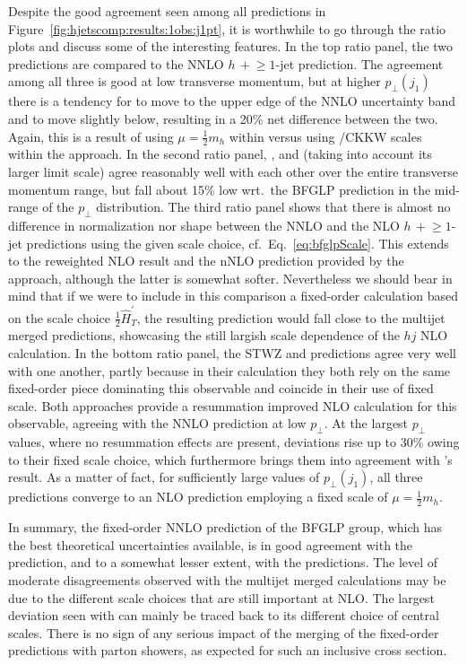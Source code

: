 Despite the good agreement seen among all predictions in
Figure~\ref{fig:hjetscomp:results:1obs:j1pt}, it is worthwhile to go
through the ratio plots and discuss some of the interesting features.
In the top ratio panel, the two \NNLOPS predictions are compared to the
NNLO $h\,+\!\ge\!1$-jet prediction. The agreement among all three is
good at low transverse momentum, but at higher $p_\perp(j_1)$ there is
a tendency for \Sherpa \NNLOPS to move to the upper edge of the NNLO 
uncertainty band and \Powheg \NNLOPS to move slightly below, resulting 
in a 20\% net difference between the two. Again, this is a result of using
$\mu=\tfrac{1}{2}m_h$ within \Sherpa versus using \Minlo/CKKW scales within the
\Powheg approach. In the second ratio panel, \Herwig, \Sherpa and \MGaMC
(taking into account its larger limit scale) agree reasonably well
with each other over the entire transverse momentum range, but fall
about 15\% low wrt.~the BFGLP prediction in the mid-range of the
$p_\perp$ distribution. The third ratio panel shows that there is almost no
difference in normalization nor shape between the NNLO and the NLO
$h\,+\!\ge\!1$-jet predictions using the given scale choice,
cf.~Eq.~\eqref{eq:bfglpScale}. This extends to the \Minlo reweighted
NLO result and the nNLO prediction provided by the \Loopsim approach,
although the latter is somewhat softer. Nevertheless we should bear in
mind that if we were to include in this comparison a fixed-order
calculation based on the scale choice $\tfrac{1}{2}\hat H_T^\prime$,
the resulting prediction would fall close to the multijet merged
predictions, showcasing the still largish scale dependence of the $hj$
NLO calculation. In the bottom ratio panel, the STWZ and \Resbos
predictions agree very well with one another, partly because in their
calculation they both rely on the same fixed-order piece dominating
this observable and coincide in their use of fixed scale. Both
approaches provide a resummation improved NLO calculation for this
observable, agreeing with the NNLO prediction at low $p_\perp$. At the
largest $p_\perp$ values, where no resummation effects are present,
deviations rise up to 30\% owing to their fixed scale choice, which
furthermore brings them into agreement with \Sherpa's \NNLOPS result.
As a matter of fact, for sufficiently large values of $p_\perp(j_1)$,
all three predictions converge to an NLO prediction employing a fixed
scale of $\mu=\tfrac{1}{2}m_h$.

In summary, the fixed-order NNLO prediction of the BFGLP group, which
has the best theoretical uncertainties available, is in good agreement
with the \Sherpa \NNLOPS prediction, and to a
somewhat lesser extent, with the \Powheg \NNLOPS predictions. The level of
moderate disagreements observed with the multijet merged calculations 
may be due to the different scale choices that are still important 
at NLO. The largest deviation seen with \MGaMC can mainly be traced
back to its different choice of central scales. There is no sign of
any serious impact of the merging of the fixed-order predictions with
parton showers, as expected for such an inclusive cross section.

